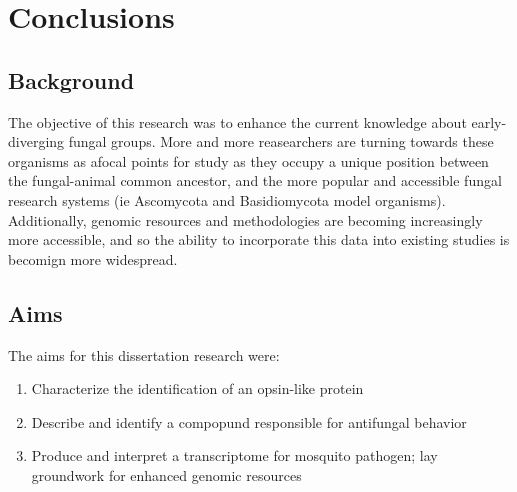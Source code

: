 \chapter{Conclusions}
\section{Background}
The objective of this research was to enhance the current knowledge about early-diverging fungal groups. More and more reasearchers are turning towards these organisms as afocal points for study as they occupy a unique position between the fungal-animal common ancestor, and the more popular and accessible fungal research systems (ie Ascomycota and Basidiomycota model organisms). Additionally, genomic resources and methodologies are becoming increasingly more accessible, and so the ability to incorporate this data into existing studies is becomign more widespread.\\
\section{Aims}
The aims for this dissertation research were:\\
\begin{enumerate}
  \item Characterize the identification of an opsin-like protein
  \item Describe and identify a compopund responsible for antifungal behavior
  \item Produce and interpret a transcriptome for mosquito pathogen; lay groundwork for enhanced genomic resources
\end{enumerate}

